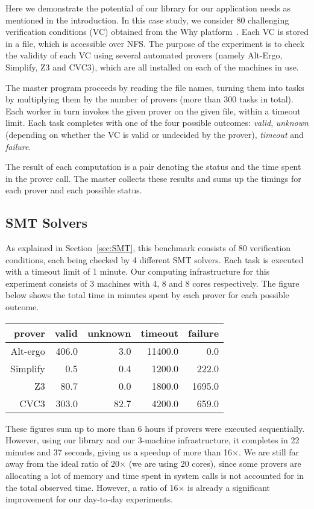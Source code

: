 \documentclass[tfpsymp,pagenumbers]{tfp07symp}
\begin{document}

Here we demonstrate the potential of our library for our application
needs as mentioned in the introduction. In this case study,
we consider 80 challenging verification conditions
(VC) obtained from the Why platform~\cite{filliatre07cav}.  Each
VC is stored in a file, which is accessible over
NFS. The purpose of the experiment is to check the validity of each VC
using several automated provers (namely Alt-Ergo, Simplify, Z3 and CVC3),
which are all installed on each of the machines in use.

The master program proceeds by reading the file names, turning them
into tasks by multiplying them by the number of provers (more than
300 tasks in total).
Each worker in turn invokes the given prover on the given file, within
a timeout limit.
Each task completes with one of the four possible outcomes: \emph{valid},
\emph{unknown} (depending on
whether the VC is valid or undecided by the prover), 
\emph{timeout} and \emph{failure}.

The result of each computation is a pair denoting the status and the
time spent in the prover call. The master collects these results and
sums up the timings for each prover and each possible status.



\subsection{SMT Solvers}

As explained in Section~\ref{sec:SMT}, this benchmark consists of 80
verification conditions, each being checked by 4 different SMT
solvers. Each task is executed with a timeout limit of 1 minute.
Our computing
infrastructure for this experiment consists of 3 machines with 4, 8 and 8 cores
respectively. 
The figure below shows the total time in minutes spent by each prover
for each possible outcome.
\begin{center}
  \begin{tabular}{|r||r|r|r|r|}
    \hline
    prover   & valid & unknown & timeout & failure
    \\\hline\hline
    Alt-ergo & 406.0 & 3.0   &  11400.0 & 0.0       
    \\\hline
    Simplify &  0.5   & 0.4   &  1200.0 & 222.0   
    \\\hline
    Z3       & 80.7   & 0.0   &  1800.0 & 1695.0   
    \\\hline
    CVC3     & 303.0  & 82.7  &  4200.0 & 659.0   
    \\\hline
  \end{tabular}
\end{center}
These figures sum up to more than 6 hours if provers were executed
sequentially. However, using our library and our 3-machine
infrastructure, it completes in 22 minutes and 37 seconds, giving us a
speedup of more than 16$\times$. We are still far away from the ideal
ratio of 20$\times$ (we are using 20 cores), since some provers are
allocating a lot of memory and time spent in system calls is not
accounted for in the total observed time. However, a ratio of
16$\times$ is already a significant improvement for our day-to-day
experiments. 
\end{document}
